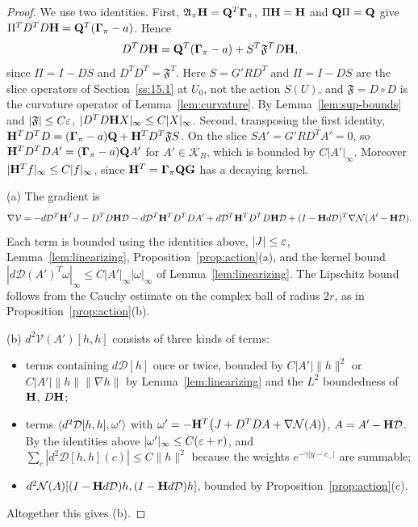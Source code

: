 \begin{proof}
We use two identities. First, $\mathfrak A_\pi\mathbf H=\mathbf Q^T\boldsymbol\Gamma_\pi$, $\Pi\mathbf H=\mathbf H$ and $\mathbf Q\Pi=\mathbf Q$ give $\Pi^TD^TD\mathbf H=\mathbf Q^T(\boldsymbol\Gamma_\pi-a)$. Hence
\[
D^TD\mathbf H=\mathbf Q^T(\boldsymbol\Gamma_\pi-a)+S^T\mathfrak F^TD\mathbf H ,
\]
since $\Pi=I-DS$ and $D^TD^T=\mathfrak F^T$. Here $S=G'RD^T$ and $\Pi=I-DS$ are the slice operators of Section~\ref{ss:15.1} at $U_0$, not the action $S(U)$, and $\mathfrak F=D\circ D$ is the curvature operator of Lemma~\ref{lem:curvature}. By Lemma~\ref{lem:sup-bounds} and $|\mathfrak F|\le C\varepsilon$, $|D^TD\mathbf H X|_\infty\le C|X|_\infty$. Second, transposing the first identity, $\mathbf H^TD^TD=(\boldsymbol\Gamma_\pi-a)\mathbf Q+\mathbf H^TD^T\mathfrak FS$. On the slice $SA'=G'RD^TA'=0$, so $\mathbf H^TD^TDA'=(\boldsymbol\Gamma_\pi-a)\mathbf Q A'$ for $A'\in\mathcal K_B$, which is bounded by $C|A'|_\infty$. Moreover $|\mathbf H^Tf|_\infty\le C|f|_\infty$, since $\mathbf H^T=\boldsymbol\Gamma_\pi\mathbf Q\mathbf G$ has a decaying kernel.

(a) The gradient is
\[
\nabla\mathcal V=-d\mathcal D^T\mathbf H^TJ-D^TD\mathbf H\mathcal D-d\mathcal D^T\mathbf H^TD^TDA'+d\mathcal D^T\mathbf H^TD^TD\mathbf H\mathcal D+(I-\mathbf H d\mathcal D)^T\nabla\mathcal N(A'-\mathbf H\mathcal D).
\]
Each term is bounded using the identities above, $|J|\le\varepsilon$, Lemma~\ref{lem:linearizing}, Proposition~\ref{prop:action}(a), and the kernel bound $|d\mathcal D(A')^T\omega|_\infty\le C|A'|_\infty|\omega|_\infty$ of Lemma~\ref{lem:linearizing}. The Lipschitz bound follows from the Cauchy estimate on the complex ball of radius $2r$, as in Proposition~\ref{prop:action}(b).

(b) $d^2\mathcal V(A')[h,h]$ consists of three kinds of terms:
\begin{itemize}
\item terms containing $d\mathcal D[h]$ once or twice, bounded by $C|A'|\|h\|^2$ or $C|A'|\|h\|\|\nabla h\|$ by Lemma~\ref{lem:linearizing} and the $L^2$ boundedness of $\mathbf H$, $D\mathbf H$;
\item terms $\langle d^2\mathcal D[h,h],\omega'\rangle$ with $\omega'=-\mathbf H^T\big(J+D^TDA+\nabla\mathcal N(A)\big)$, $A=A'-\mathbf H\mathcal D$. By the identities above $|\omega'|_\infty\le C(\varepsilon+r)$, and $\sum_c|d^2\mathcal D[h,h](c)|\le C\|h\|^2$ because the weights $e^{-\gamma|y-c_-|}$ are summable;
\item $d^2\mathcal N(A)[(I-\mathbf H d\mathcal D)h,(I-\mathbf H d\mathcal D)h]$, bounded by Proposition~\ref{prop:action}(c).
\end{itemize}
Altogether this gives (b).
\end{proof}

